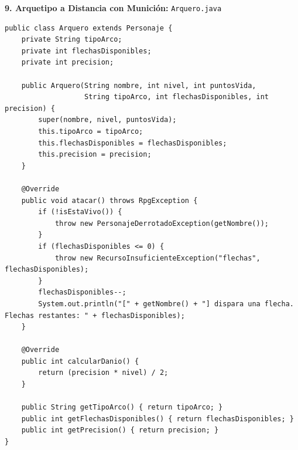 \documentclass[11pt,letterpaper]{article}
\begin{document}
\textbf{9. Arquetipo a Distancia con Munición:} \texttt{Arquero.java}
\begin{lstlisting}[style=JavaStyle]
public class Arquero extends Personaje {
    private String tipoArco;
    private int flechasDisponibles;
    private int precision;

    public Arquero(String nombre, int nivel, int puntosVida,
                   String tipoArco, int flechasDisponibles, int precision) {
        super(nombre, nivel, puntosVida);
        this.tipoArco = tipoArco;
        this.flechasDisponibles = flechasDisponibles;
        this.precision = precision;
    }

    @Override
    public void atacar() throws RpgException {
        if (!isEstaVivo()) {
            throw new PersonajeDerrotadoException(getNombre());
        }
        if (flechasDisponibles <= 0) {
            throw new RecursoInsuficienteException("flechas", flechasDisponibles);
        }
        flechasDisponibles--;
        System.out.println("[" + getNombre() + "] dispara una flecha. Flechas restantes: " + flechasDisponibles);
    }

    @Override
    public int calcularDanio() {
        return (precision * nivel) / 2;
    }

    public String getTipoArco() { return tipoArco; }
    public int getFlechasDisponibles() { return flechasDisponibles; }
    public int getPrecision() { return precision; }
}
\end{lstlisting}
\end{document}
